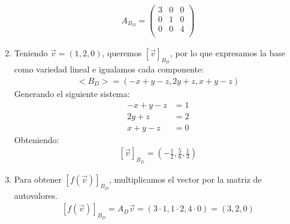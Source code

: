 \documentclass{article}
\begin{document}
\begin{enumerate}[label={(\alph*)}]
\begin{equation}
	\begin{split}
		A_{B_D}=\begin{pmatrix}
3 & 0 & 0 \\
0 & 1 & 0 \\
0 & 0 & 4 \\
\end{pmatrix}
	\end{split}
\end{equation}
\item Teniendo \(\vec{v}=(1,2,0)\), queremos \([\vec{v}]_{B_D}\), por lo que expresamos la base
	como variedad lineal e igualamos cada componente:
	\begin{equation}
		\begin{split}
			<B_{D}> = (-x+y-z,2y+z,x+y-z)
		\end{split}
	\end{equation}
	Generando el siguiente sistema:
	\begin{equation}
		\begin{split}
			-x+y-z &= 1 \\ 2y+z &= 2 \\ x+y-z &= 0
		\end{split}
	\end{equation}
	Obteniendo:
	\begin{equation}
		\begin{split}
			[\vec{v}]_{B_D}=(-\frac{1}{2}, \frac{5}{6}, \frac{1}{3})
		\end{split}
	\end{equation}
\item Para obtener \([f(\vec{v})]_{B_D}\), multiplicamos el vector por la matriz de autovalores.
	\begin{equation}
		\begin{split}
			[f(\vec{v})]_{B_D}=A_D \vec{v}=(3 \cdot 1, 1 \cdot 2, 4\cdot 0)=(3,2,0)	
		\end{split}
	\end{equation}
\end{enumerate}
\end{document}
